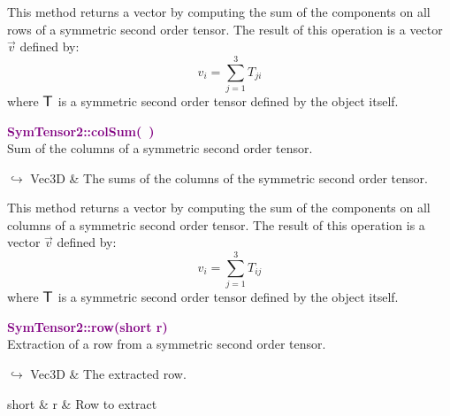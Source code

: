 This method returns a vector by computing the sum of the components on all rows of a symmetric second order tensor.
The result of this operation is a vector $\overrightarrow{v}$ defined by:
\begin{equation*}
v_{i}=\sum_{j=1}^{3} T_{ji}
\end{equation*}
where $\mbox{\large\ensuremath{\mathsf{T}}}$ is a symmetric second order tensor defined by the object itself.

\textcolor{purple}{\textbf{SymTensor2::colSum(~)}}\label{SymTensor2::colSum()}\\
Sum of the columns of a symmetric second order tensor.\vspace*{-0.5em}
\begin{tcolorbox}[grow to left by=-1cm, width=\textwidth-1cm,myArgs,tabularx={l|R}]
$\hookrightarrow$ Vec3D & The sums of the columns of the symmetric second order tensor.
\end{tcolorbox}

This method returns a vector by computing the sum of the components on all columns of a symmetric second order tensor.
The result of this operation is a vector $\overrightarrow{v}$ defined by:
\begin{equation*}
v_{i}=\sum_{j=1}^{3}T_{ij}
\end{equation*}
where $\mbox{\large\ensuremath{\mathsf{T}}}$ is a symmetric second order tensor defined by the object itself.

\textcolor{purple}{\textbf{SymTensor2::row(short r)}}\label{SymTensor2::row(short r)}\\
Extraction of a row from a symmetric second order tensor.\vspace*{-0.5em}
\begin{tcolorbox}[grow to left by=-1cm, width=\textwidth-1cm,myArgs,tabularx={l|R}]
$\hookrightarrow$ Vec3D & The extracted row.
\end{tcolorbox}

\begin{tcolorbox}[width=\textwidth,myArgs,tabularx={ll|R}]
short & r & Row to extract
\end{tcolorbox}

